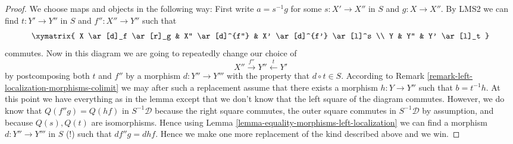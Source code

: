 \begin{proof}
We choose maps and objects in the following way:
First write $a = s^{-1}g$ for some $s : X' \to X''$ in $S$ and
$g : X \to X''$. By LMS2 we can find $t : Y' \to Y''$ in $S$ and
$f'' : X'' \to Y''$ such that
$$
\xymatrix{
X \ar[d]_f \ar[r]_g & X'' \ar[d]^{f''} & X' \ar[d]^{f'} \ar[l]^s \\
Y & Y'' & Y' \ar[l]_t
}
$$
commutes. Now in this diagram we are going to repeatedly change our
choice of
$$
X'' \xrightarrow{f''} Y'' \xleftarrow{t} Y'
$$
by postcomposing both $t$ and $f''$ by a morphism $d : Y'' \to Y'''$
with the property that $d \circ t \in S$. According to
Remark \ref{remark-left-localization-morphisms-colimit}
we may after such a replacement assume that there exists a morphism
$h : Y \to Y''$ such that $b = t^{-1}h$. At this point we have everything
as in the lemma except that we don't know that the left square of the
diagram commutes. However, we do know that $Q(f''g) = Q(hf)$ in
$S^{-1}\mathcal{D}$ because the right square commutes,
the outer square commutes in $S^{-1}\mathcal{D}$ by assumption, and
because $Q(s), Q(t)$ are isomorphisms. Hence using
Lemma \ref{lemma-equality-morphisms-left-localization}
we can find a morphism $d : Y'' \to Y'''$ in $S$ (!) such that
$df''g = dhf$. Hence we make one more replacement of the kind described
above and we win.
\end{proof}

